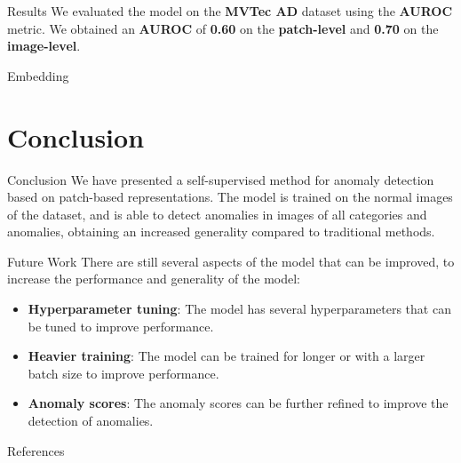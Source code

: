 \documentclass{beamer}
\begin{document}
\begin{frame}{Results}
      We evaluated the model on the \textbf{MVTec AD}\cite{mvtecad} dataset using the \textbf{AUROC} metric.
      We obtained an \textbf{AUROC} of \textbf{0.60} on the \textbf{patch-level} and \textbf{0.70} 
      on the \textbf{image-level}.
\end{frame}
\begin{frame}{Embedding}
\end{frame}
\section{Conclusion}

\begin{frame}{Conclusion}
      We have presented a self-supervised method for anomaly detection based
 on patch-based representations. The model is trained on the normal images
  of the dataset, and is able to detect 
  anomalies in images of all categories and anomalies, obtaining an increased 
  generality compared to traditional methods.
\end{frame}
\begin{frame}{Future Work}
      There are still several aspects of the model that can be improved, to 
      increase the performance and generality of the model:
      \begin{itemize}
              \item \textbf{Hyperparameter tuning}: The model has several hyperparameters
               that can be tuned to improve performance.
              \item \textbf{Heavier training}: The model can be trained for longer
               or with a larger batch size to improve performance.
               \item \textbf{Anomaly scores}: The anomaly scores can be further refined
                to improve the detection of anomalies.
                \end{itemize}
\end{frame}

\begin{frame}{References}
\printbibliography
\end{frame}


\backmatter
\end{document}
